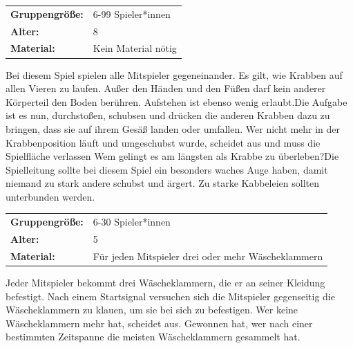 
\begin{table}[H]
\begin{tabular}{>{\bfseries}lp{8cm}}
   Gruppengröße:   & 6-99 Spieler*innen\\
    Alter: & 8 \\
    Material: & Kein Material nötig \\
\end{tabular}
\end{table} 


 Bei diesem Spiel spielen alle Mitspieler gegeneinander. Es gilt, wie Krabben auf allen Vieren zu laufen. Außer den Händen und den Füßen darf kein anderer Körperteil den Boden berühren. Aufstehen ist ebenso wenig erlaubt.Die Aufgabe ist es nun, durchstoßen, schubsen und drücken die anderen Krabben dazu zu bringen, dass sie auf ihrem Gesäß landen oder umfallen. Wer nicht mehr in der Krabbenposition läuft und umgeschubst wurde, scheidet aus und muss die Spielfläche verlassen Wem gelingt es am längsten als Krabbe zu überleben?Die Spielleitung sollte bei diesem Spiel ein besonders waches Auge haben, damit niemand zu stark andere schubst und ärgert. Zu starke Kabbeleien sollten unterbunden werden. \\



\begin{table}[H]
\begin{tabular}{>{\bfseries}lp{8cm}}
  Gruppengröße:   & 6-30 Spieler*innen\\
    Alter: & 5 \\
    Material: & Für jeden Mitspieler drei oder mehr Wäscheklammern \\
\end{tabular}
\end{table} 
 Jeder Mitspieler bekommt drei Wäscheklammern, die er an seiner Kleidung befestigt. Nach einem Startsignal versuchen sich die Mitspieler gegenseitig die Wäscheklammern zu klauen, um sie bei sich zu befestigen. Wer keine Wäscheklammern mehr hat, scheidet aus. Gewonnen hat, wer nach einer bestimmten Zeitspanne die meisten Wäscheklammern gesammelt hat. \\



